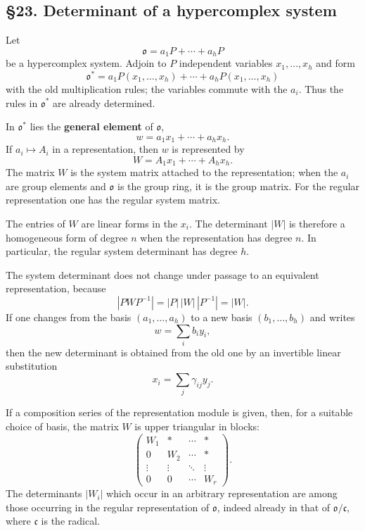 \documentclass[
  11pt,
]{article}
\begin{document}
\subsection{§23. Determinant of a hypercomplex
system}\label{determinant-of-a-hypercomplex-system}

Let \[
  \mathfrak{o}=a_1P+
\cdots+a_hP
\] be a hypercomplex system. Adjoin to \(P\) independent variables
\(x_1,\ldots,x_h\) and form \[
  \mathfrak{o}^*=a_1P(x_1,\ldots,x_h)+\cdots+a_hP(x_1,\ldots,x_h)
\] with the old multiplication rules; the variables commute with the
\(a_i\). Thus the rules in \(\mathfrak{o}^*\) are already determined.

In \(\mathfrak{o}^*\) lies the \textbf{general element} of
\(\mathfrak{o}\), \[
  w=a_1x_1+
\cdots+a_hx_h.
\] If \(a_i\mapsto A_i\) in a representation, then \(w\) is represented
by \[
  W=A_1x_1+\cdots+A_hx_h.
\] The matrix \(W\) is the system matrix attached to the representation;
when the \(a_i\) are group elements and \(\mathfrak{o}\) is the group
ring, it is the group matrix. For the regular representation one has the
regular system matrix.

The entries of \(W\) are linear forms in the \(x_i\). The determinant
\(|W|\) is therefore a homogeneous form of degree \(n\) when the
representation has degree \(n\). In particular, the regular system
determinant has degree \(h\).

The system determinant does not change under passage to an equivalent
representation, because \[
  |PWP^{-1}|=|P|\,|W|\,|P^{-1}|=|W|.
\] If one changes from the basis \((a_1,\ldots,a_h)\) to a new basis
\((b_1,\ldots,b_h)\) and writes \[
  w=\sum_i b_i y_i,
\] then the new determinant is obtained from the old one by an
invertible linear substitution \[
  x_i=\sum_j \gamma_{ij}y_j.
\]

If a composition series of the representation module is given, then, for
a suitable choice of basis, the matrix \(W\) is upper triangular in
blocks: \[
\begin{pmatrix}
W_1&*&\cdots&*\\
0&W_2&\cdots&*\\
\vdots&\vdots&\ddots&\vdots\\
0&0&\cdots&W_r
\end{pmatrix}.
\] The determinants \(|W_i|\) which occur in an arbitrary representation
are among those occurring in the regular representation of
\(\mathfrak{o}\), indeed already in that of
\(\mathfrak{o}/\mathfrak c\), where \(\mathfrak c\) is the radical.
\end{document}
